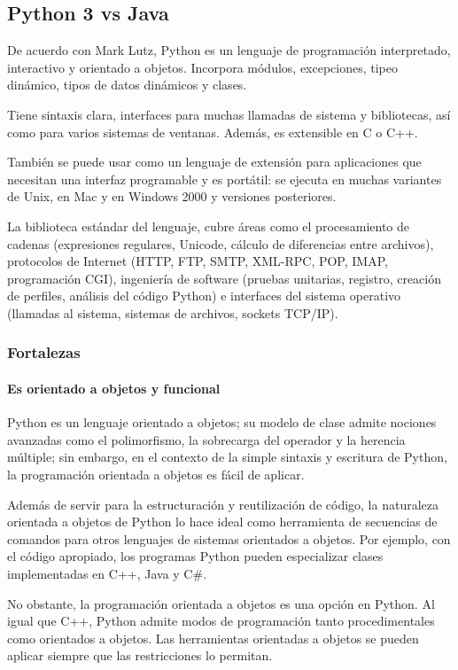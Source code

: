 \subsection{Python 3 vs Java}
De acuerdo con Mark Lutz\cite{lutz_learning_2013}, Python es un lenguaje de programación interpretado, interactivo y orientado a objetos. Incorpora módulos, excepciones, tipeo dinámico, tipos de datos dinámicos y clases.


Tiene sintaxis clara, interfaces para muchas llamadas de sistema y bibliotecas, así como para varios sistemas de ventanas. Además, es extensible en C o C++. 


También se puede usar como un lenguaje de extensión para aplicaciones que necesitan una interfaz programable y es portátil: se ejecuta en muchas variantes de Unix, en Mac y en Windows 2000 y versiones posteriores.


La biblioteca estándar del lenguaje, cubre áreas como el procesamiento de cadenas (expresiones regulares, Unicode, cálculo de diferencias entre archivos), protocolos de Internet (HTTP, FTP, SMTP, XML-RPC, POP, IMAP, programación CGI), ingeniería de software (pruebas unitarias, registro, creación de perfiles, análisis del código Python) e interfaces del sistema operativo (llamadas al sistema, sistemas de archivos, sockets TCP/IP).

\subsubsection*{Fortalezas}

\paragraph*{Es orientado a objetos y funcional}
Python es un lenguaje orientado a objetos; su modelo de clase admite nociones avanzadas como el polimorfismo, la sobrecarga del operador y la herencia múltiple; sin embargo, en el contexto de la simple sintaxis y escritura de Python, la programación orientada a objetos es fácil de aplicar.


Además de servir para la estructuración y reutilización de código, la naturaleza orientada a objetos de Python lo hace ideal como herramienta de secuencias de comandos para otros lenguajes de sistemas orientados a objetos. Por ejemplo, con el código apropiado, los programas Python pueden especializar clases implementadas en C++, Java y C\#.


No obstante, la programación orientada a objetos es una opción en Python. Al igual que C++, Python admite modos de programación tanto procedimentales como orientados a objetos. Las herramientas orientadas a objetos se pueden aplicar siempre que las restricciones lo permitan. 


